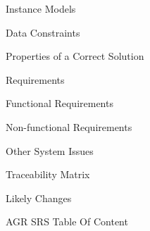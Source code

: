 \begin{figure}[hp]
\begin{myEnumerate}
\begin{myEnumerate}
\begin{myEnumerate}
	\item Instance Models
	\item Data Constraints
	\item Properties of a Correct Solution
	\end{myEnumerate}
	\end{myEnumerate}
	\item Requirements
	\begin{myEnumerate}
	\item Functional Requirements
	\item Non-functional Requirements
	\end{myEnumerate}
	\item Other System Issues
	\item Traceability Matrix
	\item Likely Changes
    \end{myEnumerate}
    \caption[AGR SRS Table Of Content]{AGR SRS Table Of Content}
    \label{fig_agr_srs_toc}
\end{figure}

